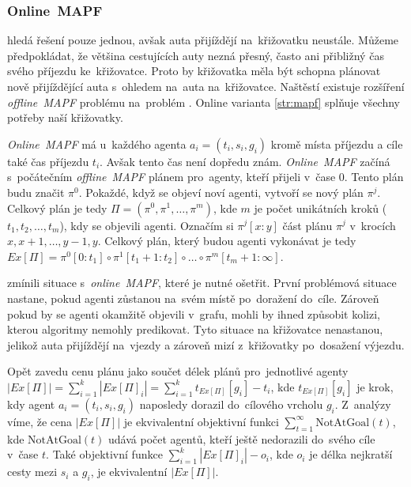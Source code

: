 \subsubsection{Online~MAPF}\label{subsubsec:online_mapf}

%

 hledá řešení pouze jednou, avšak auta přijíždějí na~křižovatku neustále.
Můžeme předpokládat, že většina cestujících auty nezná přesný, často ani přibližný čas svého příjezdu ke~křižovatce.
Proto by křižovatka měla být schopna plánovat nově přijíždějící auta s~ohledem na~auta na~křižovatce.
Naštěstí existuje rozšíření \emph{offline~MAPF} problému na~problém  \citep*{Svancara}.
Online varianta \ref{str:mapf} splňuje všechny potřeby naší křižovatky.

\emph{Online~MAPF} má u~každého agenta $a_i = (t_i, s_i, g_i)$ kromě místa příjezdu a cíle také čas příjezdu $t_i$.
Avšak tento čas není dopředu znám.
\emph{Online~MAPF} začíná s~počátečním \emph{offline~MAPF} plánem pro~agenty, kteří přijeli v~čase $0$.
Tento plán budu značit $\pi^0$.
Pokaždé, když se objeví noví agenti, vytvoří se nový plán $\pi^j$.
Celkový plán je tedy $\Pi = (\pi^0, \pi^1, \dots, \pi^m)$, kde $m$ je počet unikátních kroků ($t_1, t_2, \dots, t_m$), kdy se objevili agenti.
Označím si $\pi^j[x:y]$ část plánu $\pi^j$ v~krocích $x, x + 1, \dots, y - 1, y$.
Celkový plán, který budou agenti vykonávat je tedy $Ex[\Pi] = \pi^0[0:t_1] \circ \pi^1[t_1 + 1:t_2] \circ \dots \circ \pi^m[t_m + 1:\infty]$.

\citet{Svancara} zmínili situace s~\emph{online~MAPF}, které je nutné ošetřit.
První problémová situace nastane, pokud agenti zůstanou na~svém místě po~doražení do~cíle.
Zároveň pokud by se agenti okamžitě objevili v~grafu, mohli by ihned způsobit kolizi, kterou algoritmy nemohly predikovat.
Tyto situace na křižovatce nenastanou, jelikož auta přijíždějí na~vjezdy
a zároveň mizí z~křižovatky po~dosažení výjezdu.

Opět zavedu cenu plánu jako součet délek plánů pro~jednotlivé agenty $|Ex[\Pi]| = \sum_{i=1}^{k} |Ex[\Pi]_i| = \sum_{i=1}^{k} t_{Ex[\Pi]}[g_i] - t_i$,
kde $t_{Ex[\Pi]}[g_i]$ je krok, kdy agent $a_i = (t_i, s_i, g_i)$ naposledy dorazil do~cílového vrcholu $g_i$.
Z~analýzy \citet{Svancara} víme, že cena $|Ex[\Pi]|$ je ekvivalentní objektivní funkci $\sum_{t=1}^{\infty} \textrm{NotAtGoal}(t)$,
kde $\textrm{NotAtGoal}(t)$ udává počet agentů, kteří ještě nedorazili do~svého cíle v~čase $t$.
Také objektivní funkce $\sum_{i=1}^{k} |Ex[\Pi]_i| - o_i$, kde $o_i$ je délka nejkratší cesty mezi $s_i$ a $g_i$,
je ekvivalentní $|Ex[\Pi]|$.

